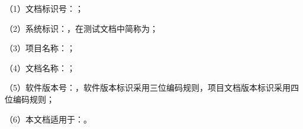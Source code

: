 （1）文档标识号：\GjbDocId；

（2）系统标识：\GjbSystemIdent，在测试文档中简称为\GjbSystemDocAbbr；

（3）项目名称：\GjbProjectName；

（4）文档名称：\GjbDocTitle；

（5）软件版本号：\GjbSoftwareVersion，软件版本标识采用三位编码规则，项目文档版本标识采用四位编码规则；

（6）本文档适用于：\GjbDocApplicableText。
